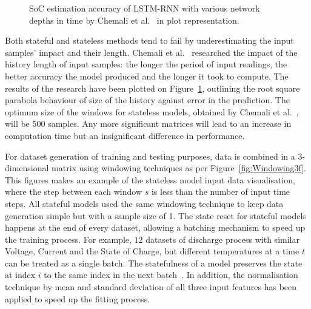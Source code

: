 %
%
\begin{figure}[htbp]
    \centering
    
    \caption{SoC estimation accuracy of LSTM-RNN with various network depths in time by Chemali et al.~\cite{Chemali2017} in plot representation.}
    \label{fig:chemali-accuracy}
\end{figure}
Both stateful and stateless methods tend to fail by underestimating the input samples' impact and their length.
Chemali et al.~\cite{Chemali2017} researched the impact of the history length of input samples: the longer the period of input readings, the better accuracy the model produced and the longer it took to compute.
The results of the research have been plotted on \mbox{Figure~\ref{fig:chemali-accuracy}}, outlining the root square parabola behaviour of size of the history against error in the prediction.
The optimum size of the windows for stateless models, obtained by Chemali et al.~\cite{Chemali2017}, will be 500 samples.
Any more significant matrices will lead to an increase in computation time but an insignificant difference in performance.

%
%
For dataset generation of training and testing purposes, data is combined in a 3-dimensional matrix using windowing techniques as per \mbox{Figure~\ref{fig:Windowing3f}}.
This figures makes an example of the stateless model input data visualisation, where the step between each window $s$ is less than the number of input time steps.
All stateful models used the same windowing technique to keep data generation simple but with a sample size of 1.
The state reset for stateful models happens at the end of every dataset, allowing a batching mechanism to speed up the training process.
For example, 12 datasets of discharge process with similar Voltage, Current and the State of Charge, but different temperatures at a time $t$ can be treated as a single batch.
The statefulness of a model preserves the state at index $i$ to the same index in the next batch~\cite{zhu_statefulnes_tfdocs_2020}.
In addition, the normalisation technique by mean and standard deviation of all three input features has been applied to speed up the fitting process.

